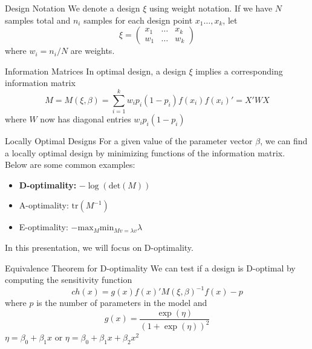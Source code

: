 \documentclass[11pt]{beamer}
\begin{document}
\begin{frame}{Design Notation}
We denote a design $\xi$ using weight notation. If we have $N$ samples total and $n_i$ samples for each design point $x_1 \dots, x_k$, let 
$$
\xi =
\begin{pmatrix}
x_1 & \dots & x_k\\
w_1 & \dots & w_k
\end{pmatrix}
$$
where $w_i = n_i/N$ are weights.
\end{frame}


\begin{frame}{Information Matrices}
In optimal design, a design $\xi$  implies a corresponding information matrix
$$
M = M(\xi, \beta) = \sum_{i=1}^k w_ip_i (1-p_i) f(x_i) f(x_i)' = X'WX
$$
where $W$ now has diagonal entries $w_i p_i (1-p_i)$
\end{frame}

\begin{frame}{Locally Optimal Designs}
For a given value of the parameter vector $\beta$, we can find a locally optimal design by minimizing functions of the information matrix. Below are some common examples:
\begin{itemize}
\item \textbf{D-optimality:} $-\log\left(\text{det}(M)\right)$
\item A-optimality: $\text{tr}(M^{-1})$
\item E-optimality: $-\text{max}_{M} \text{min}_{Mv = \lambda v} \lambda$
\end{itemize}


In this presentation, we will focus on D-optimality.
\end{frame}

\begin{frame}{Equivalence Theorem for D-optimality}
We can test if a design is D-optimal by computing the sensitivity function
$$
ch(x) = g(x) f(x)'M(\xi, \beta)^{-1} f(x) - p
$$
where $p$ is the number of parameters in the model and 
$$
g(x) = \frac{\exp(\eta)}{(1+\exp(\eta))^2}
$$
$\eta = \beta_0  + \beta_1 x$ or $\eta = \beta_0 + \beta_1 x + \beta_2 x^2$
\end{frame}
\end{document}
